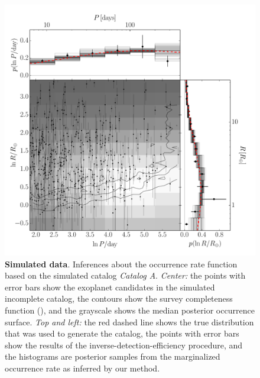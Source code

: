 \documentclass[12pt,preprint]{aastex}
\newcommand{\figlabel}[1]{\label{fig:#1}}
\newcommand{\modela}{\emph{Catalog A}}
\begin{document}
\begin{figure}[p]
\begin{center}
\includegraphics[width=\textwidth]{figures/smooth/results.pdf}
\end{center}
\caption{%
{\bf Simulated data}.
Inferences about the occurrence rate function based on the simulated catalog
\modela.
\emph{Center:} the points with error bars show the exoplanet candidates in the
simulated incomplete catalog, the contours show the survey completeness
function (\citealt{petigura}), and the grayscale shows the median posterior
occurrence surface.
\emph{Top and left:} the red dashed line shows the true distribution that was
used to generate the catalog, the points with error bars show the results of
the inverse-detection-efficiency procedure, and the histograms are posterior
samples from the marginalized occurrence rate as inferred by our method.
\figlabel{smooth-results}}
\end{figure}
\end{document}
